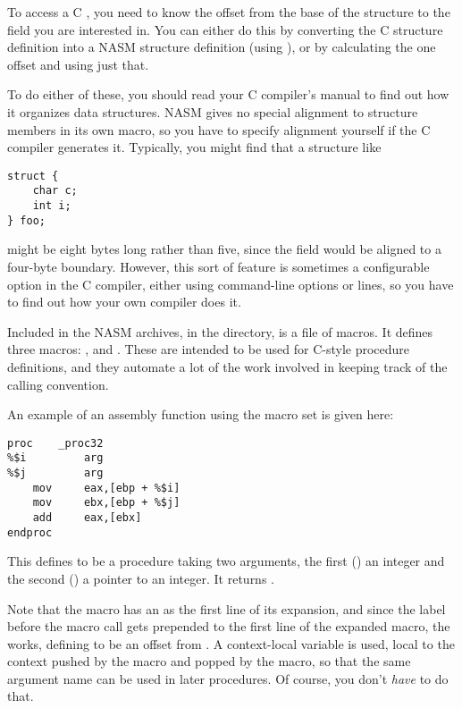 To access a C , you need to know the offset from
the base of the structure to the field you are interested in. You
can either do this by converting the C structure definition into a
NASM structure definition (using ), or by calculating the
one offset and using just that.

To do either of these, you should read your C compiler's manual to
find out how it organizes data structures. NASM gives no special
alignment to structure members in its own  macro,
so you have to specify alignment yourself if the C compiler generates it.
Typically, you might find that a structure like

\begin{lstlisting}
struct {
    char c;
    int i;
} foo;
\end{lstlisting}

might be eight bytes long rather than five, since the  field
would be aligned to a four-byte boundary. However, this sort of
feature is sometimes a configurable option in the C compiler, either
using command-line options or  lines, so you have to find
out how your own compiler does it.


Included in the NASM archives, in the 
directory, is a file  of macros. It defines three macros:
,  and . These are
intended to be used for C-style procedure definitions, and they automate
a lot of the work involved in keeping track of the calling convention.

An example of an assembly function using the macro set is given
here:

\begin{lstlisting}
proc    _proc32
%$i         arg
%$j         arg
    mov     eax,[ebp + %$i]
    mov     ebx,[ebp + %$j]
    add     eax,[ebx]
endproc
\end{lstlisting}

This defines  to be a procedure taking two arguments, the
first () an integer and the second () a pointer to an
integer. It returns .

Note that the  macro has an  as the first line of its
expansion, and since the label before the macro call gets prepended
to the first line of the expanded macro, the  works, defining
 to be an offset from . A context-local variable is
used, local to the context pushed by the  macro and popped
by the  macro, so that the same argument name can be used
in later procedures. Of course, you don't \emph{have} to do that.


